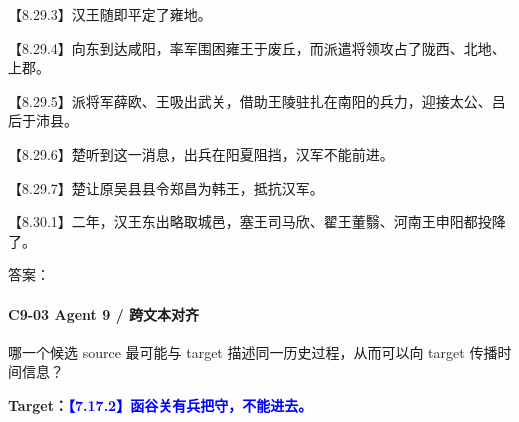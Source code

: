 \documentclass[fontset=none,11pt,a4paper]{ctexart}
\newcommand{\answerline}[1]{\underline{\hspace{#1}}}
\begin{document}
\begin{enumerate}[label=\Alph*.]
\noindent 【8.29.3】汉王随即平定了雍地。\par
\noindent 【8.29.4】向东到达咸阳，率军围困雍王于废丘，而派遣将领攻占了陇西、北地、上郡。\par
\noindent 【8.29.5】派将军薛欧、王吸出武关，借助王陵驻扎在南阳的兵力，迎接太公、吕后于沛县。\par
\noindent 【8.29.6】楚听到这一消息，出兵在阳夏阻挡，汉军不能前进。\par
\noindent 【8.29.7】楚让原吴县县令郑昌为韩王，抵抗汉军。\par
\noindent 【8.30.1】二年，汉王东出略取城邑，塞王司马欣、翟王董翳、河南王申阳都投降了。\par
\end{enumerate}
答案：\answerline{2.2cm}

\paragraph{C9-03 \quad Agent 9 / 跨文本对齐}
哪一个候选 source 最可能与 target 描述同一历史过程，从而可以向 target 传播时间信息？

\textbf{Target：}\textcolor{blue}{\textbf{【7.17.2】函谷关有兵把守，不能进去。}}
\end{document}

